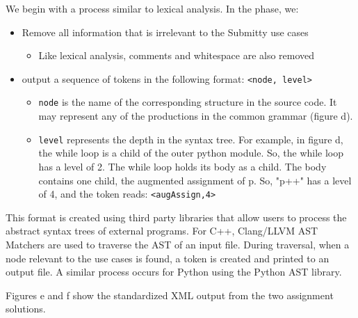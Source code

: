\documentclass[thesis]{hmcposter}
\begin{document}
\begin{poster}
We begin with a process similar to lexical analysis. In the phase, we:

\begin{itemize}
\item Remove all information that is irrelevant to the Submitty use cases 
	\begin{itemize}
	\item Like lexical analysis, comments and whitespace are also removed
	\end{itemize}
\item output a sequence of tokens in the following format: \texttt{<node, level>}
	\begin{itemize}
	\item \texttt{node} is the name of the corresponding structure in the source code. It may represent any of the productions in the common grammar (figure d).
	\item \texttt{level} represents the depth in the syntax tree. For example, in figure d, the while loop is a child of the outer python module. So, the while loop has a level of 2. The while loop holds its body as a child. The body contains one child, the augmented assignment of p. So, "p++" has a level of 4, and the token reads: \texttt{<augAssign,4>}
	\end{itemize}
\end{itemize}
\vspace{0.5in}

This format is created using third party libraries that allow users to process the abstract syntax trees of external programs. For C++, Clang/LLVM AST Matchers are used to traverse the AST of an input file. During traversal, when a node relevant to the use cases is found, a token is created and printed to an output file. A similar process occurs for Python using the Python AST library.

Figures e and f show the standardized XML output from the two assignment solutions.

\begin{figure}
\begin{center}
\end{center}
\end{figure}


\end{poster}
\end{document}
